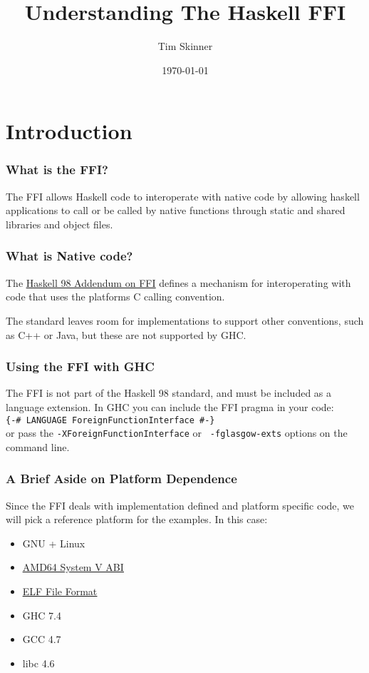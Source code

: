 \documentclass{beamer}
\title{Understanding The Haskell FFI}
\author{Tim Skinner}
\date{\today}
\newcommand{\chref}[3] {
    {\color{#1} \href{#2}{\underline{#3}}}
}
\begin{document}
\begin{frame}
    \titlepage
\end{frame}

\section{Introduction}
\begin{frame}
    \frametitle{What is the FFI?}

    The FFI allows Haskell code to interoperate with native code by allowing
    haskell applications to call or be called by native functions through
    static and shared libraries and object files.

\end{frame}

\begin{frame}
    \frametitle{What is Native code?}

    The \chref{darkgray}
    {http://www.cse.unsw.edu.au/~chak/haskell/ffi/ffi/ffi.html} {Haskell 98
    Addendum on FFI} defines a mechanism for interoperating with code that uses
    the platforms C calling convention.

    The standard leaves room for implementations to support other conventions,
    such as C++ or Java, but these are not supported by GHC.
\end{frame}

\begin{frame}
    \frametitle{Using the FFI with GHC}

    The FFI is not part of the Haskell 98 standard, and must be included as a
    language extension.  In GHC you can include the FFI pragma in your code: \\
    \vspace{2mm} {\tt \{-\# LANGUAGE ForeignFunctionInterface \#-\}} \\
    \vspace{2mm} or pass the {\tt -XForeignFunctionInterface} or {\tt
    -fglasgow-exts} options on the command line.
\end{frame}

\begin{frame}
    \frametitle{A Brief Aside on Platform Dependence}

    Since the FFI deals with implementation defined and platform specific code,
    we will pick a reference platform for the examples.  In this case:

    \begin{itemize}
        \item {GNU + Linux}
        \item {\chref{darkgray}{http://www.uclibc.org/docs/psABI-x86_64.pdf}{AMD64 System V ABI}}
        \item {\chref{darkgray}{http://www.skyfree.org/linux/references/ELF_Format.pdf}{ELF File Format}}
        \item {GHC 7.4}
        \item {GCC 4.7}
        \item {libc 4.6}
    \end{itemize}
\end{frame}
\end{document}
